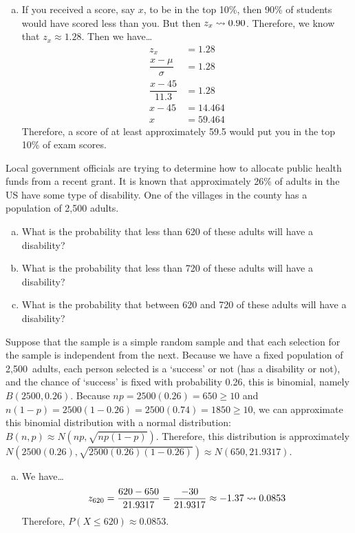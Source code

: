 \documentclass[12pt,letterpaper]{exam}
\begin{document}
\begin{questions}
{\begin{enumerate}[(a)]
\item If you received a score, say $x$, to be in the top 10\%, then 90\% of students would have scored less than you. But then $z_x \rightsquigarrow 0.90$. Therefore, we know that $z_x \approx 1.28$. Then we have\dots
	\[
	\begin{aligned}
	z_x&= 1.28 \\[0.3cm]
	\dfrac{x - \mu}{\sigma}&= 1.28 \\[0.3cm]
	\dfrac{x - 45}{11.3}&= 1.28 \\[0.3cm]
	x - 45&= 14.464 \\[0.3cm]
	x&= 59.464
	\end{aligned}
	\]
Therefore, a score of at least approximately 59.5 would put you in the top 10\% of exam scores. 
\end{enumerate}
}



\newpage
\question[10] Local government officials are trying to determine how to allocate public health funds from a recent grant. It is known that approximately 26\% of adults in the US have some type of disability. One of the villages in the county has a population of 2,500 adults.
	\begin{enumerate}[(a)]
	\item What is the probability that less than 620 of these adults will have a disability?
	\item What is the probability that less than 720 of these adults will have a disability?
	\item What is the probability that between 620 and 720 of these adults will have a disability?
	\end{enumerate} \pspace

\sol Suppose that the sample is a simple random sample and that each selection for the sample is independent from the next. Because we have a fixed population of 2,500~adults, each person selected is a `success' or not (has a disability or not), and the chance of `success' is fixed with probability 0.26, this is binomial, namely $B(2500, 0.26)$. Because $np= 2500(0.26)= 650 \geq 10$ and $n(1 - p)= 2500(1 - 0.26)= 2500(0.74)= 1850 \geq 10$, we can approximate this binomial distribution with a normal distribution: $B(n, p) \approx N(np, \sqrt{np(1 - p)})$. Therefore, this distribution is approximately $N(2500(0.26), \sqrt{2500(0.26)(1 - 0.26)}) \approx N(650, 21.9317)$. 

\begin{enumerate}[(a)]
\item We have\dots
	\[
	z_{620}= \dfrac{620 - 650}{21.9317}= \dfrac{-30}{21.9317} \approx -1.37 \rightsquigarrow 0.0853
	\]
Therefore, $P(X \leq 620) \approx 0.0853$. \pspace


\end{enumerate}
\end{questions}
\end{document}

